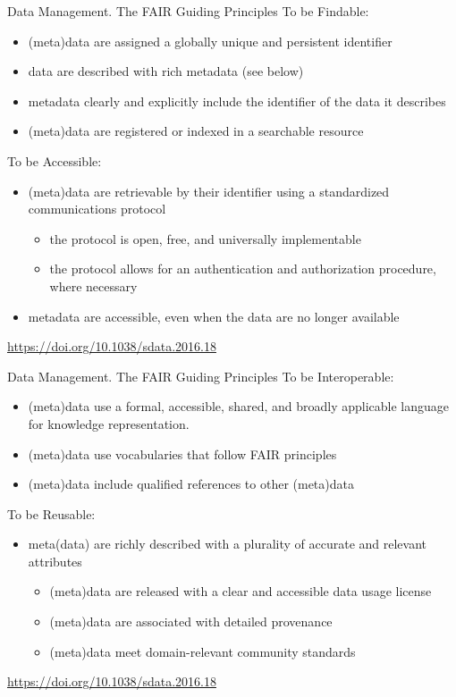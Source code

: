 \documentclass[ignorenonframetext,aspectratio=169,10pt,xcolor=table]{beamer}
\begin{document}
\begin{frame}{Data Management. The FAIR Guiding Principles}
To be Findable:
\begin{itemize}
\item (meta)data are assigned a globally unique and persistent identifier
\item data are described with rich metadata (see below)
\item metadata clearly and explicitly include the identifier of the data it describes
\item (meta)data are registered or indexed in a searchable resource
\end{itemize}

To be Accessible:
\begin{itemize}
\item (meta)data are retrievable by their identifier using a standardized communications protocol
\begin{itemize}
\item the protocol is open, free, and universally implementable
\item the protocol allows for an authentication and authorization procedure, where necessary
\end{itemize}
\item metadata are accessible, even when the data are no longer available
\end{itemize}

\begin{flushright}
{\tiny \url{https://doi.org/10.1038/sdata.2016.18}}
\end{flushright}
\end{frame}

\begin{frame}{Data Management. The FAIR Guiding Principles}
To be Interoperable:
\begin{itemize}
\item (meta)data use a formal, accessible, shared, and broadly applicable language for knowledge representation.
\item (meta)data use vocabularies that follow FAIR principles
\item (meta)data include qualified references to other (meta)data
\end{itemize}

To be Reusable:
\begin{itemize}
\item meta(data) are richly described with a plurality of accurate and relevant
attributes
\begin{itemize}
\item (meta)data are released with a clear and accessible data usage license
\item (meta)data are associated with detailed provenance
\item (meta)data meet domain-relevant community standards
\end{itemize}
\end{itemize}

\begin{flushright}
{\tiny \url{https://doi.org/10.1038/sdata.2016.18}}
\end{flushright}

\end{frame}
\end{document}
